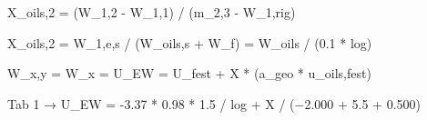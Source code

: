 X_{oils,2} = (W_{1,2} - W_{1,1}) / (m_{2,3} - W_{1,rig})

X_{oils,2} = W_{1,e,s} / (W_{oils,s} + W_{f}) = W_{oils} / (0.1 * log)

W_{x,y} = W_{x} = U_{EW} = U_{fest} + X * (a_{geo} * u_{oils,fest})

Tab 1 → U_{EW} = -3.37 * 0.98 * 1.5 / log + X / (−2.000 + 5.5 + 0.500)